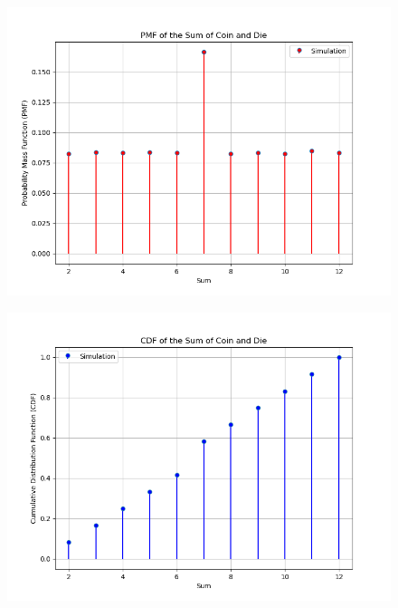 \documentclass[journal]{IEEEtran}
\begin{document}
\begin{figure}[ht]
\centering
\includegraphics[width=\columnwidth]{figs/pmf.png}
\label{fig:pmf} 
\end{figure}

\begin{figure}[ht]
\centering
\includegraphics[width=\columnwidth]{figs/cdf.png}
\label{fig:cdf} 
\end{figure}
\end{document}
